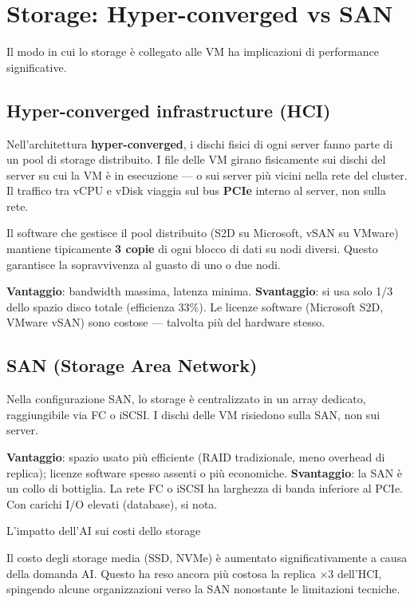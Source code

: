 \documentclass[
  italian,
  openany]{book}
\begin{document}
\section{Storage: Hyper-converged vs
SAN}\label{storage-hyper-converged-vs-san}

Il modo in cui lo storage è collegato alle VM ha implicazioni di
performance significative.

\subsection{Hyper-converged infrastructure
(HCI)}\label{hyper-converged-infrastructure-hci}

Nell'architettura \textbf{hyper-converged}, i dischi fisici di ogni
server fanno parte di un pool di storage distribuito. I file delle VM
girano fisicamente sui dischi del server su cui la VM è in esecuzione
--- o sui server più vicini nella rete del cluster. Il traffico tra vCPU
e vDisk viaggia sul bus \textbf{PCIe} interno al server, non sulla rete.

Il software che gestisce il pool distribuito (S2D su Microsoft, vSAN su
VMware) mantiene tipicamente \textbf{3 copie} di ogni blocco di dati su
nodi diversi. Questo garantisce la sopravvivenza al guasto di uno o due
nodi.

\textbf{Vantaggio}: bandwidth massima, latenza minima.
\textbf{Svantaggio}: si usa solo 1/3 dello spazio disco totale
(efficienza 33\%). Le licenze software (Microsoft S2D, VMware vSAN) sono
costose --- talvolta più del hardware stesso.

\subsection{SAN (Storage Area Network)}\label{san-storage-area-network}

Nella configurazione SAN, lo storage è centralizzato in un array
dedicato, raggiungibile via FC o iSCSI. I dischi delle VM risiedono
sulla SAN, non sui server.

\textbf{Vantaggio}: spazio usato più efficiente (RAID tradizionale, meno
overhead di replica); licenze software spesso assenti o più economiche.
\textbf{Svantaggio}: la SAN è un collo di bottiglia. La rete FC o iSCSI
ha larghezza di banda inferiore al PCIe. Con carichi I/O elevati
(database), si nota.

\begin{calloutwarning}{L’impatto dell’AI sui costi dello storage}

Il costo degli storage media (SSD, NVMe) è aumentato significativamente
a causa della domanda AI. Questo ha reso ancora più costosa la replica
×3 dell'HCI, spingendo alcune organizzazioni verso la SAN nonostante le
limitazioni tecniche.

\end{calloutwarning}
\end{document}
